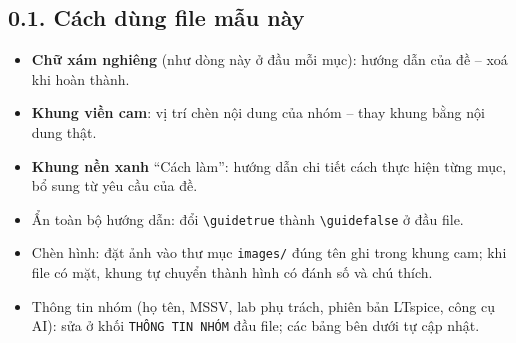 \documentclass[12pt,a4paper]{article}
\begin{document}
\subsection*{0.1. Cách dùng file mẫu này}
\begin{itemize}
  \item \textbf{Chữ xám nghiêng} (như dòng này ở đầu mỗi mục): hướng dẫn của đề -- xoá khi hoàn thành.
  \item \textbf{Khung viền cam}: vị trí chèn nội dung của nhóm -- thay khung bằng nội dung thật.
  \item \textbf{Khung nền xanh} ``Cách làm'': hướng dẫn chi tiết cách thực hiện từng mục, bổ sung từ yêu cầu của đề.
  \item Ẩn toàn bộ hướng dẫn: đổi \texttt{\textbackslash guidetrue} thành \texttt{\textbackslash guidefalse} ở đầu file.
  \item Chèn hình: đặt ảnh vào thư mục \texttt{images/} đúng tên ghi trong khung cam; khi file có mặt, khung tự chuyển thành hình có đánh số và chú thích.
  \item Thông tin nhóm (họ tên, MSSV, lab phụ trách, phiên bản LTspice, công cụ AI): sửa ở khối \texttt{THÔNG TIN NHÓM} đầu file; các bảng bên dưới tự cập nhật.
\end{itemize}
\end{document}

